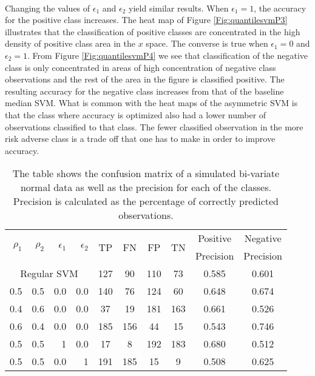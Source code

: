\\Changing the values of $\epsilon_1$ and $\epsilon_2$ yield similar results. When $\epsilon_1=1$, the accuracy for the positive class increases. The heat map of Figure \ref{Fig:quantilesvmP3} illustrates that the classification of positive classes are concentrated in the high density of positive class area in the $x$ space. The converse is true when $\epsilon_1=0$ and $\epsilon_2=1$. From Figure \ref{Fig:quantilesvmP4} we see that classification of the negative class is only concentrated in areas of high concentration of negative class observations and the rest of the area in the figure is classified positive. The resulting accuracy for the negative class increases from that of the baseline median SVM. What is common with the heat maps of the asymmetric SVM is that the class where accuracy is optimized also had a lower number of observations classified to that class. The fewer classified observation in the more risk adverse class is a trade off that one has to make in order to improve accuracy.


\begin{table}[htp]\label{simulatedsvmtable}

\begin{tabular}{rrrr|cccccc}

\hline
 \multirow{2}{*}{$\rho_1$} & \multirow{2}{*}{$\rho_2$} & \multirow{2}{*}{$\epsilon_1$} & \multirow{2}{*}{$\epsilon_2$} & \multirow{2}{*}{TP}    & \multirow{2}{*}{FN}    & \multirow{2}{*}{FP}    & \multirow{2}{*}{TN} & Positive & Negative \\
    &&&&&&&&  Precision &  Precision \\

\hline
\hline
\multicolumn{4}{c|}{Regular SVM} &        127 &         90 &        110 &         73 &      0.585 &      0.601 \\

0.5   & 0.5   & 0.0   & 0.0 &        140 &         76 &        124 &         60 &      0.648 &      0.674 \\

0.4   & 0.6   & 0.0   & 0.0 &         37 &         19 &        181 &        163 &      0.661 &      0.526 \\

0.6   & 0.4   & 0.0   & 0.0 &        185 &        156 &         44 &         15 &      0.543 &      0.746 \\

0.5   & 0.5   & 1   & 0.0 &         17 &          8 &        192 &        183 &      0.680 &      0.512 \\

0.5   & 0.5   & 0.0   & 1 &        191 &        185 &         15 &          9 &      0.508 &      0.625 \\
\hline
\hline
\end{tabular}
\caption{The table shows the confusion matrix of a simulated bi-variate normal data as well as the precision for each of the classes. Precision is calculated as the percentage of correctly predicted observations.}
\end{table}

